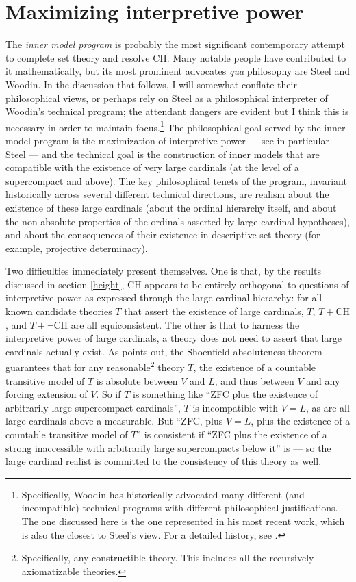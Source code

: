 \documentclass[letterpaper,12pt]{article}
\begin{document}
\section{Maximizing interpretive power}
\label{maximizingpower}
The \emph{inner model program} is probably the most significant contemporary attempt to complete set theory and resolve CH. Many notable people have contributed to it mathematically, but its most prominent advocates \emph{qua} philosophy are Steel and Woodin. In the discussion that follows, I will somewhat conflate their philosophical views, or perhaps rely on Steel as a philosophical interpreter of Woodin's technical program; the attendant dangers are evident but I think this is necessary in order to maintain focus.\footnote{Specifically, Woodin has historically advocated many different (and incompatible) technical programs with different philosophical justifications. The one discussed here is the one represented in his most recent work, which is also the closest to Steel's view. For a detailed history, see \cite{sep-continuum-hypothesis}.} The philosophical goal served by the inner model program is the maximization of interpretive power --- see in particular Steel \citeyearpar{feferman2000does,steel2012godel} --- and the technical goal is the construction of inner models that are compatible with the existence of very large cardinals (at the level of a supercompact and above). The key philosophical tenets of the program, invariant historically across several different technical directions, are realism about the existence of these large cardinals (about the ordinal hierarchy itself, and about the non-absolute properties of the ordinals asserted by large cardinal hypotheses), and about the consequences of their existence in descriptive set theory (for example, projective determinacy).

Two difficulties immediately present themselves. One is that, by the results discussed in section \ref{height}, CH appears to be entirely orthogonal to questions of interpretive power as expressed through the large cardinal hierarchy: for all known candidate theories $T$ that assert the existence of large cardinals, $T$, $T + \mathrm{CH}$, and $T + \neg \mathrm{CH}$ are all equiconsistent. The other is that to harness the interpretive power of large cardinals, a theory does not need to assert that large cardinals actually exist. As \cite{hamkins2011set} points out, the Shoenfield absoluteness theorem guarantees that for any reasonable\footnote{Specifically, any constructible theory. This includes all the recursively axiomatizable theories.} theory $T$, the existence of a countable transitive model of $T$ is absolute between $V$ and $L$, and thus between $V$ and any forcing extension of $V$. So if $T$ is something like ``ZFC plus the existence of arbitrarily large supercompact cardinals'', $T$ is incompatible with $V = L$, as are all large cardinals above a measurable. But ``ZFC, plus $V = L$, plus the existence of a countable transitive model of $T$'' is consistent if ``ZFC plus the existence of a strong inaccessible with arbitrarily large supercompacts below it'' is --- so the large cardinal realist is committed to the consistency of this theory as well.
\end{document}
